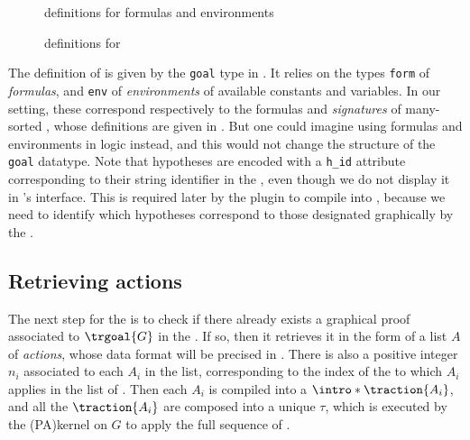 \begin{figure}
  
  \caption{ definitions for  formulas and environments}
\end{figure}

\begin{figure}
  
  \caption{ definitions for }
\end{figure}

The  definition of  is given by the \texttt{goal} type in
. It relies on
the  types \texttt{form} of \emph{formulas}, and \texttt{env} of
\emph{environments} of available constants and variables. In our setting, these
correspond respectively to the formulas and \emph{signatures} of many-sorted
, whose  definitions are given in . But
one could imagine using formulas and environments in  logic
instead, and this would not change the structure of the \texttt{goal} datatype.
Note that hypotheses are encoded with a \texttt{h\_id} attribute corresponding
to their string identifier in the  , even though we do not
display it in 's interface. This is required later by the plugin to
compile  into , because we need to identify which 
hypotheses correspond to those designated graphically by the .

\subsection{Retrieving actions}

\AP
The next step for the  is to check if there already exists a
graphical proof associated to $\trgoal{G}$ in the . If so,
then it retrieves it in the form of a list $A$ of \emph{actions}, whose data
format will be precised in . There is also a positive
integer $n_i$ associated to each  $A_i$ in the list, corresponding to the
index of the  to which $A_i$ applies in the list of . Then
each $A_i$ is compiled into a  $\intro*\traction{A_i}$, and all the
$\traction{A_i}$ are composed into a unique  $\tau$, which is
executed by the \kl(PA){kernel} on $G$ to apply the full sequence of .

